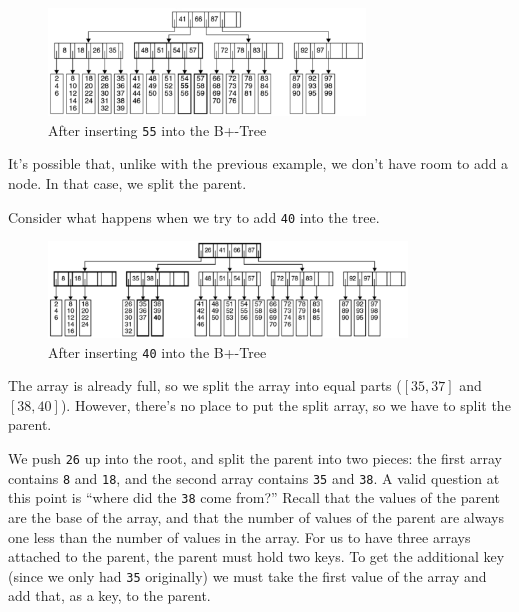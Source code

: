 \documentclass[
  10pt,
  english,
  letterpaper,
,tablecaptionabove
]{scrartcl}
\newcommand{\passthrough}[1]{#1}
\begin{document}
\begin{figure}
\centering
\includegraphics[width=0.75\textwidth,height=\textheight]{images/9.png}
\caption{After inserting \passthrough{\lstinline!55!} into the B+-Tree}
\end{figure}

It's possible that, unlike with the previous example, we don't have room
to add a node. In that case, we split the parent.

Consider what happens when we try to add \passthrough{\lstinline!40!}
into the tree.

\begin{figure}
\centering
\includegraphics[width=0.85\textwidth,height=\textheight]{images/10.png}
\caption{After inserting \passthrough{\lstinline!40!} into the B+-Tree}
\end{figure}

The array is already full, so we split the array into equal parts
(\([35,37]\) and \([38,40]\)). However, there's no place to put the
split array, so we have to split the parent.

We push \passthrough{\lstinline!26!} up into the root, and split the
parent into two pieces: the first array contains
\passthrough{\lstinline!8!} and \passthrough{\lstinline!18!}, and the
second array contains \passthrough{\lstinline!35!} and
\passthrough{\lstinline!38!}. A valid question at this point is
\enquote{where did the \passthrough{\lstinline!38!} come from?} Recall
that the values of the parent are the base of the array, and that the
number of values of the parent are always one less than the number of
values in the array. For us to have three arrays attached to the parent,
the parent must hold two keys. To get the additional key (since we only
had \passthrough{\lstinline!35!} originally) we must take the first
value of the array and add that, as a key, to the parent.
\end{document}
